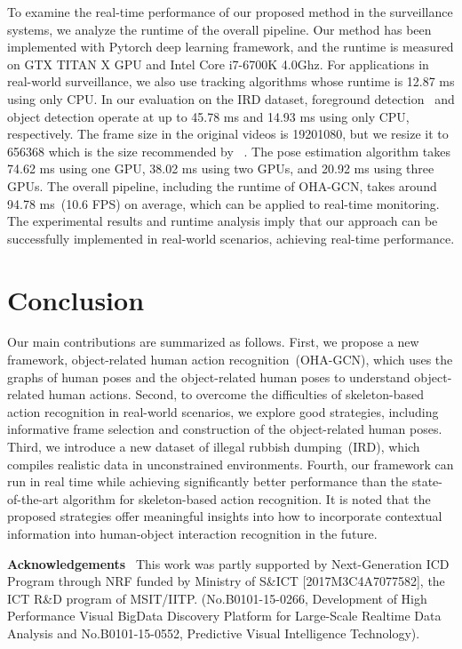 \documentclass[10pt,twocolumn,letterpaper]{article}
\begin{document}
To examine the real-time performance of our proposed method in the surveillance systems, we analyze the runtime of the overall pipeline.
Our method has been implemented with Pytorch deep learning framework, and the runtime is measured on GTX TITAN X GPU and Intel Core i7-6700K 4.0Ghz.
For applications in real-world surveillance, we also use tracking algorithms whose runtime is 12.87 ms using only CPU. In our evaluation on the IRD dataset, foreground detection~\cite{cao2017realtime} and object detection operate at up to 45.78 ms and 14.93 ms using only CPU, respectively.
The frame size in the original videos is 19201080, but we resize it to 656368 which is the size recommended by ~\cite{cao2017realtime}.
The pose estimation algorithm takes 74.62 ms using one GPU, 38.02 ms using two GPUs, and 20.92 ms using three GPUs.
The overall pipeline, including the runtime of OHA-GCN, takes around 94.78 ms~(10.6 FPS) on average, which can be applied to real-time monitoring.
The experimental results and runtime analysis imply that our approach can be successfully implemented in real-world scenarios, achieving real-time performance.


\section{Conclusion}
Our main contributions are summarized as follows. 
First, we propose a new framework, object-related human action recognition~(OHA-GCN), which uses the graphs of human poses and the object-related human poses to understand object-related human actions.
Second, to overcome the difficulties of skeleton-based action recognition in real-world scenarios, we explore good strategies, including informative frame selection and construction of the object-related human poses. 
Third, we introduce a new dataset of illegal rubbish dumping~(IRD), which compiles realistic data in unconstrained environments. 
Fourth, our framework can run in real time while achieving significantly better performance than the state-of-the-art algorithm for skeleton-based action recognition.
It is noted that the proposed strategies offer meaningful insights into how to incorporate contextual information into human-object interaction recognition in the future.



\vspace{2mm}
\noindent\textbf{Acknowledgements}
\ This work was partly supported by  
Next-Generation ICD Program through NRF funded by Ministry of S\&ICT [2017M3C4A7077582], 
the ICT R\&D program of MSIT/IITP. (No.B0101-15-0266, Development of High Performance Visual BigData Discovery Platform for Large-Scale Realtime Data Analysis and No.B0101-15-0552, Predictive Visual Intelligence Technology).
\normalsize

{\small


}
\end{document}
